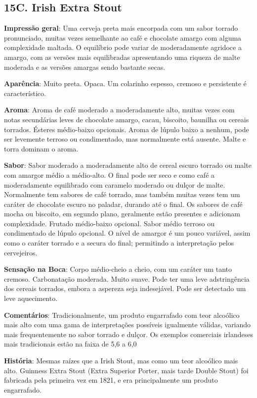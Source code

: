 \subsection*{15C. Irish Extra Stout}
\textbf{Impressão geral}: Uma cerveja preta mais encorpada com um sabor torrado pronunciado, muitas vezes semelhante ao café e chocolate amargo com alguma complexidade maltada. O equilíbrio pode variar de moderadamente agridoce a amargo, com as versões mais equilibradas apresentando uma riqueza de malte moderada e as versões amargas sendo bastante secas.

\textbf{Aparência}: Muito preta. Opaca. Um colarinho espesso, cremoso e persistente é característico.

\textbf{Aroma}: Aroma de café moderado a moderadamente alto, muitas vezes com notas secundárias leves de chocolate amargo, cacau, biscoito, baunilha ou cereais torrados. Ésteres médio-baixo opcionais. Aroma de lúpulo baixo a nenhum, pode ser levemente terroso ou condimentado, mas normalmente está ausente. Malte e torra dominam o aroma.

\textbf{Sabor}: Sabor moderado a moderadamente alto de cereal escuro torrado ou malte com amargor médio a médio-alto. O final pode ser seco e como café a moderadamente equilibrado com caramelo moderado ou dulçor de malte. Normalmente tem sabores de café torrado, mas também muitas vezes tem um caráter de chocolate escuro no paladar, durando até o final. Os sabores de café mocha ou biscoito, em segundo plano, geralmente estão presentes e adicionam complexidade. Frutado médio-baixo opcional. Sabor médio terroso ou condimentado de lúpulo opcional. O nível de amargor é um pouco variável, assim como o caráter torrado e a secura do final; permitindo a interpretação pelos cervejeiros.

\textbf{Sensação na Boca}: Corpo médio-cheio a cheio, com um caráter um tanto cremoso. Carbonatação moderada. Muito suave. Pode ter uma leve adstringência dos cereais torrados, embora a aspereza seja indesejável. Pode ser detectado um leve aquecimento.

\textbf{Comentários}: Tradicionalmente, um produto engarrafado com teor alcoólico mais alto com uma gama de interpretações possíveis igualmente válidas, variando mais frequentemente no sabor torrado e dulçor. Os exemplos comerciais irlandeses mais tradicionais estão na faixa de 5,6 a 6,0%

\textbf{História}: Mesmas raízes que a Irish Stout, mas como um teor alcoólico mais alto. Guinness Extra Stout (Extra Superior Porter, mais tarde Double Stout) foi fabricada pela primeira vez em 1821, e era principalmente um produto engarrafado.

